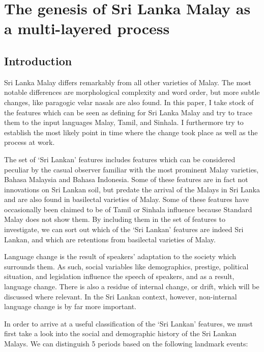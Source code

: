  
\chapter[The genesis of SLM as a multi-layered process]{The genesis of Sri Lanka Malay as a multi-layered process} 
 
  
\section{Introduction}
Sri Lanka Malay differs remarkably from all other varieties of Malay. The most notable differences are morphological complexity and word order, but more subtle changes, like paragogic velar nasals are also found. In this paper, I take stock of the features which can be seen as defining for Sri Lanka Malay and try to trace them to the input languages Malay, Tamil, and Sinhala. I furthermore try to establish the most likely point in time where the change took place as well as the process at work.

The set of `Sri Lankan' features includes features which can be considered peculiar by the casual observer familiar with the most prominent Malay varieties, Bahasa Malaysia and Bahasa Indonesia. Some of these features are in fact not innovations on Sri Lankan soil, but predate the arrival of the Malays in Sri Lanka and are also found in basilectal varieties of Malay. Some of these features have occasionally been claimed to be of Tamil or Sinhala influence because Standard Malay does not show them. By including them in the set of features to investigate, we can sort out which of the `Sri Lankan' features are indeed Sri Lankan, and which are retentions from basilectal varieties of Malay.

Language change is the result of speakers' adaptation to the society which surrounds them. As such, social variables like demographics, prestige, political situation, and legislation influence the speech of speakers, and as a result, language change. There is also a residue of internal change, or drift, which will be discussed where relevant. In the Sri Lankan context, however, non-internal language change is by far more important.

In order to arrive at a useful classification of the `Sri Lankan' features, we must first take a look into the social and demographic history of the Sri Lankan Malays. We can distinguish 5 periods based on the following landmark events:

